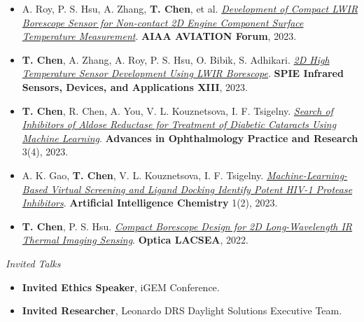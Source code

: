 \documentclass[letterpaper,10pt]{article}
\begin{document}
\begin{itemize}[leftmargin=0.15in, label={}, itemsep=-1pt, topsep=0pt, parsep=0pt]
  \item A. Roy, P. S. Hsu, A. Zhang, \textbf{T. Chen}, et al. \textit{\href{https://doi.org/10.2514/6.2023-3580}{Development of Compact LWIR Borescope Sensor for Non-contact 2D Engine Component Surface Temperature Measurement}}. \textbf{AIAA AVIATION Forum}, 2023.
  \item \textbf{T. Chen}, A. Zhang, A. Roy, P. S. Hsu, O. Bibik, S. Adhikari. \textit{\href{https://doi.org/10.1117/12.2672622}{2D High Temperature Sensor Development Using LWIR Borescope}}. \textbf{SPIE Infrared Sensors, Devices, and Applications XIII}, 2023.
  \item \textbf{T. Chen}, R. Chen, A. You, V. L. Kouznetsova, I. F. Tsigelny. \textit{\href{https://doi.org/10.1016/j.aopr.2023.09.002}{Search of Inhibitors of Aldose Reductase for Treatment of Diabetic Cataracts Using Machine Learning}}. \textbf{Advances in Ophthalmology Practice and Research} 3(4), 2023.
  \item A. K. Gao, \textbf{T. Chen}, V. L. Kouznetsova, I. F. Tsigelny. \textit{\href{https://doi.org/10.1016/j.aichem.2023.100014}{Machine-Learning-Based Virtual Screening and Ligand Docking Identify Potent HIV-1 Protease Inhibitors}}. \textbf{Artificial Intelligence Chemistry} 1(2), 2023.
  \item \textbf{T. Chen}, P. S. Hsu. \textit{\href{https://opg.optica.org/abstract.cfm?uri=LACSEA-2022-LM1B.5}{Compact Borescope Design for 2D Long-Wavelength IR Thermal Imaging Sensing}}. \textbf{Optica LACSEA}, 2022.
\end{itemize}
\vspace{3pt}\textit{Invited Talks}
\begin{itemize}[leftmargin=0.15in, label={}, itemsep=-1pt, topsep=0pt, parsep=0pt]
  \item \textbf{Invited Ethics Speaker}, iGEM Conference.
  \item \textbf{Invited Researcher}, Leonardo DRS Daylight Solutions Executive Team.
\end{itemize}
\end{document}
